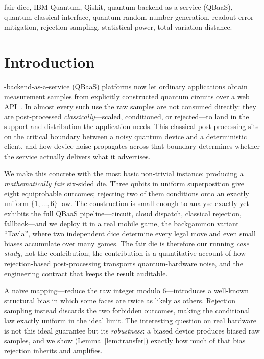 \documentclass{ieeeaccess}
\begin{document}
\begin{IEEEkeywords}
fair dice, IBM Quantum, Qiskit, quantum-backend-as-a-service (QBaaS), quantum-classical interface, quantum random number generation, readout error mitigation, rejection sampling, statistical power, total variation distance.
\end{IEEEkeywords}

\titlepgskip=-15pt

\maketitle

\section{Introduction}

-backend-as-a-service (QBaaS) platforms now let ordinary applications obtain measurement samples from explicitly constructed quantum circuits over a web API~\cite{ibmquantum2024}. In almost every such use the raw samples are not consumed directly: they are post-processed \emph{classically}---scaled, conditioned, or rejected---to land in the support and distribution the application needs. This classical post-processing sits on the critical boundary between a noisy quantum device and a deterministic client, and how device noise propagates across that boundary determines whether the service actually delivers what it advertises.

We make this concrete with the most basic non-trivial instance: producing a \emph{mathematically fair} six-sided die. Three qubits in uniform superposition give eight equiprobable outcomes; rejecting two of them conditions onto an exactly uniform $\{1,\dots,6\}$ law. The construction is small enough to analyse exactly yet exhibits the full QBaaS pipeline---circuit, cloud dispatch, classical rejection, fallback---and we deploy it in a real mobile game, the backgammon variant ``Tavla'', where two independent dice determine every legal move and even small biases accumulate over many games. The fair die is therefore our running \emph{case study}, not the contribution; the contribution is a quantitative account of how rejection-based post-processing transports quantum-hardware noise, and the engineering contract that keeps the result auditable.

A naïve mapping---reduce the raw integer modulo $6$---introduces a well-known structural bias in which some faces are twice as likely as others. Rejection sampling instead discards the two forbidden outcomes, making the conditional law exactly uniform in the ideal limit. The interesting question on real hardware is not this ideal guarantee but its \emph{robustness}: a biased device produces biased raw samples, and we show (Lemma~\ref{lem:transfer}) exactly how much of that bias rejection inherits and amplifies.
\end{document}
